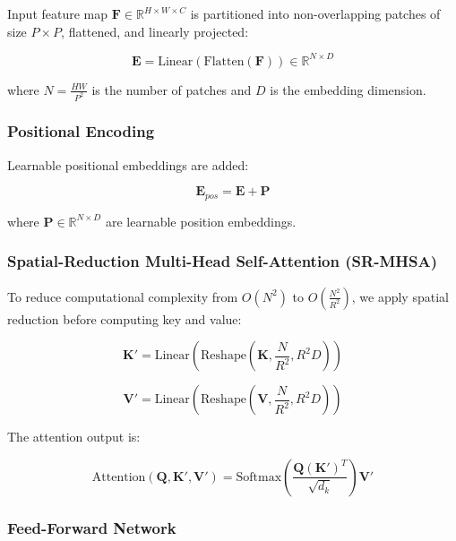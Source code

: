 \documentclass[default, iicol]{sn-jnl}
\theoremstyle{thmstyleone}%
\theoremstyle{thmstyletwo}%
\theoremstyle{thmstylethree}%
\begin{document}
Input feature map $\mathbf{F} \in \mathbb{R}^{H \times W \times C}$ is partitioned into non-overlapping patches of size $P \times P$, flattened, and linearly projected:

\begin{equation}
\mathbf{E} = \text{Linear}(\text{Flatten}(\mathbf{F})) \in \mathbb{R}^{N \times D}
\label{eq:patch_embed}
\end{equation}

where $N = \frac{HW}{P^2}$ is the number of patches and $D$ is the embedding dimension.

\subsubsection{Positional Encoding}

Learnable positional embeddings are added:

\begin{equation}
\mathbf{E}_{pos} = \mathbf{E} + \mathbf{P}
\label{eq:pos_embed}
\end{equation}

where $\mathbf{P} \in \mathbb{R}^{N \times D}$ are learnable position embeddings.

\subsubsection{Spatial-Reduction Multi-Head Self-Attention (SR-MHSA)}

To reduce computational complexity from $O(N^2)$ to $O(\frac{N^2}{R^2})$, we apply spatial reduction before computing key and value:

\begin{equation}
\mathbf{K}' = \text{Linear}(\text{Reshape}(\mathbf{K}, \frac{N}{R^2}, R^2D))
\label{eq:sr_key}
\end{equation}

\begin{equation}
\mathbf{V}' = \text{Linear}(\text{Reshape}(\mathbf{V}, \frac{N}{R^2}, R^2D))
\label{eq:sr_value}
\end{equation}

The attention output is:

\begin{equation}
\text{Attention}(\mathbf{Q}, \mathbf{K}', \mathbf{V}') = \text{Softmax}\left(\frac{\mathbf{Q}(\mathbf{K}')^T}{\sqrt{d_k}}\right)\mathbf{V}'
\label{eq:attention}
\end{equation}

\subsubsection{Feed-Forward Network}
\end{document}

